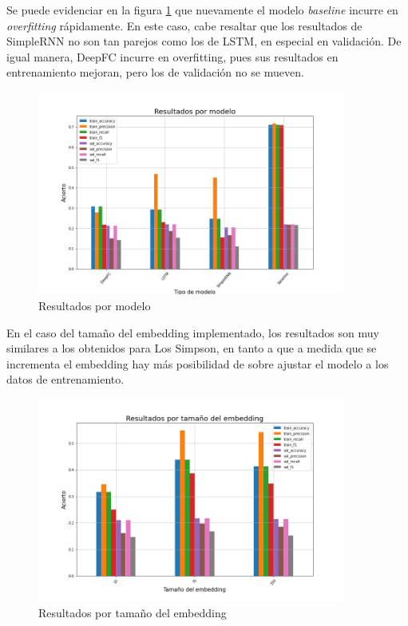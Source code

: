 Se puede evidenciar en la figura \ref{fig:fri_deep_model} que nuevamente el modelo \textit{baseline} incurre en \textit{overfitting} rápidamente. En este caso, cabe resaltar que los resultados de SimpleRNN no son tan parejos como los de LSTM, en especial en validación. De igual manera, DeepFC incurre en overfitting, pues sus resultados en entrenamiento mejoran, pero los de validación no se mueven.\\

\begin{figure}[H]
    \centering
    \includegraphics[width=0.9\textwidth]{results/friends/deepModels/sim_res_deep_model.png}
    \caption{Resultados por modelo}
    \label{fig:fri_deep_model}
\end{figure}

En el caso del tamaño del embedding implementado, los resultados son muy similares a los obtenidos para Los Simpson, en tanto a que a medida que se incrementa el embedding hay más posibilidad de sobre ajustar el modelo a los datos de entrenamiento.\\

\begin{figure}[H]
    \centering
    \includegraphics[width=0.9\textwidth]{results/friends/deepModels/sim_res_deep_em_size.png}
    \caption{Resultados por tamaño del embedding}
    \label{fig:fri_deep_em_size}
\end{figure}

